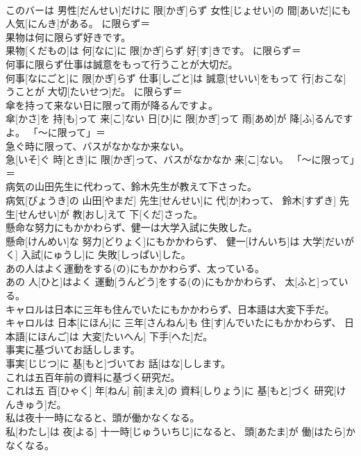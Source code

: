 \documentclass[8pt]{extreport}
\begin{document}
\begin{CJK}{UTF8}{min}
\\	このバーは 男性[だんせい]だけに 限[かぎ]らず 女性[じょせい]の 間[あいだ]にも 人気[にんき]がある。	に限らず＝ 
\\	果物は何に限らず好きです。	
\\	果物[くだもの]は 何[なに]に 限[かぎ]らず 好[す]きです。	に限らず＝ 
\\	何事に限らず仕事は誠意をもって行うことが大切だ。	
\\	何事[なにごと]に 限[かぎ]らず 仕事[しごと]は 誠意[せいい]をもって 行[おこな]うことが 大切[たいせつ]だ。	に限らず＝ 
\\	傘を持って来ない日に限って雨が降るんですよ。	
\\	傘[かさ]を 持[も]って 来[こ]ない 日[ひ]に 限[かぎ]って 雨[あめ]が 降[ふ]るんですよ。	「〜に限って」＝ 
\\	急ぐ時に限って、バスがなかなか来ない。	
\\	急[いそ]ぐ 時[とき]に 限[かぎ]って、バスがなかなか 来[こ]ない。	「〜に限って」＝ 
\\	病気の山田先生に代わって、鈴木先生が教えて下さった。	
\\	病気[びょうき]の 山田[やまだ] 先生[せんせい]に 代[か]わって、 鈴木[すずき] 先生[せんせい]が 教[おし]えて 下[くだ]さった。	
\\	懸命な努力にもかかわらず、健一は大学入試に失敗した。	
\\	懸命[けんめい]な 努力[どりょく]にもかかわらず、 健一[けんいち]は 大学[だいがく] 入試[にゅうし]に 失敗[しっぱい]した。	
\\	あの人はよく運動をする(の)にもかかわらず、太っている。	
\\	あの 人[ひと]はよく 運動[うんどう]をする(の)にもかかわらず、 太[ふと]っている。	
\\	キャロルは日本に三年も住んでいたにもかかわらず、日本語は大変下手だ。	
\\	キャロルは 日本[にほん]に 三年[さんねん]も 住[す]んでいたにもかかわらず、 日本語[にほんご]は 大変[たいへん] 下手[へた]だ。	
\\	事実に基づいてお話しします。	
\\	事実[じじつ]に 基[もと]づいてお 話[はな]しします。	
\\	これは五百年前の資料に基づく研究だ。	
\\	これは五 百[ひゃく] 年[ねん] 前[まえ]の 資料[しりょう]に 基[もと]づく 研究[けんきゅう]だ。	
\\	私は夜十一時になると、頭が働かなくなる。	
\\	私[わたし]は 夜[よる] 十一時[じゅういちじ]になると、 頭[あたま]が 働[はたら]かなくなる。	

\end{CJK}
\end{document}
